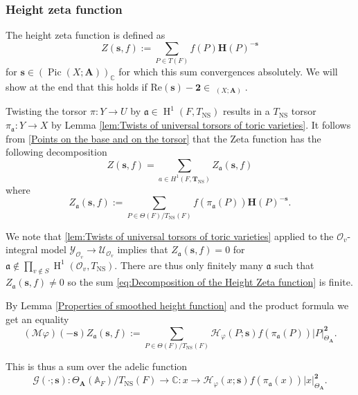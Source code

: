 \documentclass[a4paper,11pt,reqno]{amsart}
\newcommand{\C}{\mathbb{C}}
\newcommand{\A}{\mathbb{A}}
\DeclareMathOperator{\Pic}{Pic}
\DeclareMathOperator{\NS}{NS}
\DeclareMathOperator{\Eff}{\overline{Eff}}
\DeclareMathOperator{\HH}{H}
\renewcommand{\Re}{\mathrm{Re}}
\theoremstyle{definition}
\begin{document}
\subsubsection{Height zeta function}
The height zeta function is defined as
\begin{equation*}
	Z(\bm{s},f) := \sum_{P \in T(F)} f(P) \mathbf{H}(P)^{- \bm{s}}
\end{equation*}
for $\bm{s} \in (\Pic(X ; \mathbf{A}))_{\C}$ for which this sum convergences absolutely. We will show at the end that this holds if $\Re(\bm{s}) - \mathbf{2} \in \Eff_{(X ; \mathbf{A})}$.

Twisting the torsor $\pi:Y \to U$ by $\mathfrak{a} \in \HH^1(F, T_{\NS})$ results in a $T_{\NS}$ torsor $\pi_{\mathfrak{a}}: Y \to X$ by Lemma \ref{lem:Twists of universal torsors of toric varieties}. It follows from \eqref{Points on the base and on the torsor} that the Zeta function has the following decomposition
\begin{equation}\label{eq:Decomposition of the Height Zeta function}
	Z(\bm{s}, f) = \sum_{a \in H^1(F, \mathbf{T}_{\NS})} Z_{\mathfrak{a}}(\bm{s}, f)
\end{equation}
where 
\begin{equation*}
	Z_{\mathfrak{a}}(\bm{s}, f) := \sum_{P \in \Theta(F)/T_{\NS}(F)} f(\pi_{\mathfrak{a}}(P)) \mathbf{H}(P)^{-\bm{s}}.
\end{equation*}

We note that \ref{lem:Twists of universal torsors of toric varieties} applied to the $\mathcal{O}_{v}$-integral model $\mathcal{Y}_{\mathcal{O}_v} \to \mathcal{U}_{\mathcal{O}_v}$ implies that $Z_{\mathfrak{a}}(\bm{s}, f) = 0$ for $\mathfrak{a} \not \in \prod_{v \not \in S} \HH^1(\mathcal{O}_v, T_{\NS})$. There are thus only finitely many $\mathfrak{a}$ such that $Z_{\mathfrak{a}}(\bm{s}, f) \neq 0$ so the sum \eqref{eq:Decomposition of the Height Zeta function} is finite.

By Lemma \ref{Properties of smoothed height function} and the product formula we get an equality
\begin{equation*}
	(\mathcal{M} \varphi)(-\bm{s}) Z_{\mathfrak{a}}(\bm{s}, f):= \sum_{P \in\Theta(F)/T_{\NS}(F)} \mathcal{H}_{\varphi}(P ; \bm{s}) f(\pi_{\mathfrak{a}}(P))|P|^{\mathbf{2}}_{\Theta_{\mathbf{A}}}.
\end{equation*}

This is thus a sum over the adelic function
\begin{equation*}
	\mathcal{G}(\cdot ; \bm{s}): \Theta_{\mathbf{A}}(\A_F)/T_{\NS}(F) \to \C: x \to \mathcal{H}_{\varphi}(x; \bm{s}) f(\pi_{\mathfrak{a}}(x))|x|^{\mathbf{2}}_{\Theta_{\mathbf{A}}}.
\end{equation*}
\end{document}
